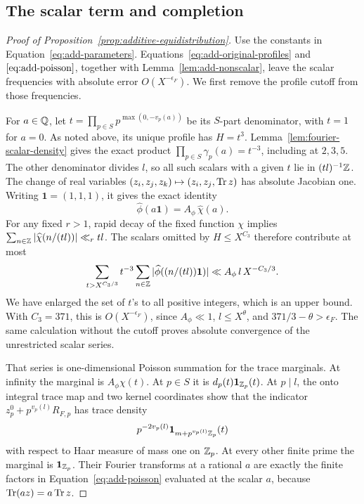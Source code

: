 \subsection{The scalar term and completion}

\begin{proof}[Proof of Proposition~\ref{prop:additive-equidistribution}]
Use the constants in Equation~\eqref{eq:add-parameters}.
Equations~\eqref{eq:add-original-profiles} and \(\eqref{eq:add-poisson}\),
together with Lemma~\ref{lem:add-nonscalar}, leave the scalar frequencies
with absolute error \(O(X^{-\epsilon_F})\).  We first remove the profile
cutoff from those frequencies.

For \(a\in\mathbb Q\), let \(t=\prod_{p\in S}p^{\max(0,-v_p(a))}\) be its
\(S\)-part denominator, with \(t=1\) for \(a=0\).  As noted above, its
unique profile has \(H=t^3\).
Lemma~\ref{lem:fourier-scalar-density} gives the exact product
\(\prod_{p\in S}\gamma_p(a)=t^{-3}\), including at \(2,3,5\).
The other denominator divides \(l\), so all such scalars with a given \(t\)
lie in \((tl)^{-1}\mathbb Z\).  The change of real variables
\((z_i,z_j,z_k)\mapsto(z_i,z_j,\operatorname{Tr} z)\) has absolute Jacobian one.
Writing \(\mathbf 1=(1,1,1)\), it gives the exact identity
\[
 \widehat\phi(a\mathbf 1)=A_\phi\,\widehat\chi(a).
\]
For any fixed \(r>1\), rapid decay of the fixed function \(\chi\) implies
\(\sum_{n\in\mathbb Z}|\widehat\chi(n/(tl))|\ll_r tl\).
The scalars omitted by \(H\le X^{C_3}\) therefore contribute at most
\begin{equation}
 \sum_{t>X^{C_3/3}}t^{-3}
       \sum_{n\in\mathbb Z}|\widehat\phi((n/(tl))\mathbf 1)|
    \ll A_\phi\,l\,X^{-C_3/3}.
 \label{eq:add-scalar-tail}
\end{equation}
We have enlarged the set of \(t\)'s to all positive integers, which is an
upper bound.  With \(C_3=371\), this is \(O(X^{-\epsilon_F})\), since
\(A_\phi\ll1\), \(l\le X^\theta\), and \(371/3-\theta>\epsilon_F\).
The same calculation without the cutoff proves
absolute convergence of the unrestricted scalar series.

That series is one-dimensional Poisson summation for the trace marginals.
At infinity the marginal is \(A_\phi\chi(t)\).  At \(p\in S\) it is
\(d_p(t)\mathbf 1_{\mathbb Z_p}(t)\).  At \(p\mid l\), the onto integral trace map
and two kernel coordinates show that the indicator
\(z_p^0+p^{v_p(l)}R_{F,p}\) has trace density
\[
 p^{-2v_p(l)}\mathbf 1_{m+p^{v_p(l)}\mathbb Z_p}(t)
\]
with respect to Haar measure of mass one on \(\mathbb Z_p\).  At every other
finite prime the marginal is \(\mathbf 1_{\mathbb Z_p}\).
Their Fourier transforms at a rational \(a\) are exactly the finite factors
in Equation~\eqref{eq:add-poisson} evaluated at the scalar \(a\), because
\(\operatorname{Tr}(az)=a\operatorname{Tr} z\).


\end{proof}
